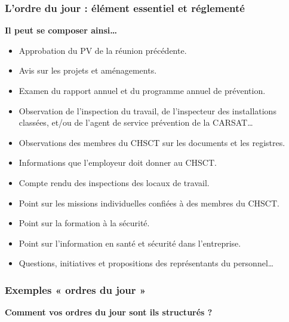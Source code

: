 \documentclass{beamer}
\begin{document}
\begin{frame}
\frametitle{L’ordre du jour : élément essentiel et réglementé}

\textbf{Il peut se composer ainsi…}

\begin{itemize}
\item Approbation du PV de la réunion précédente.

\item Avis sur les projets et aménagements.

\item Examen du rapport annuel et du programme annuel de prévention.

\item Observation de l’inspection du travail, de l’inspecteur des installations classées, et/ou de l’agent de service prévention de la CARSAT…

\item Observations des membres du CHSCT sur les documents et les registres.

\item Informations que l’employeur doit donner au CHSCT.

\item Compte rendu des inspections des locaux de travail.

\item Point sur les missions individuelles confiées à des membres du CHSCT.

\item Point sur la formation à la sécurité.

\item Point sur l’information en santé et sécurité dans l’entreprise.

\item Questions, initiatives et propositions des représentants du personnel…
\end{itemize}
\end{frame}


\begin{frame}
\frametitle{Exemples « ordres du jour »}

\textbf{Comment vos ordres du jour sont ils structurés ?}
\end{frame}
\end{document}
